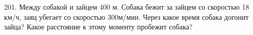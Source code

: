 201.  Между собакой и зайцем 400 м. Собака бежит за зайцем со скоростью 18 км/ч, заяц убегает со скоростью 300м/мин. Через какое время собака догонит зайца? Какое расстояние к этому моменту пробежит собака?\\
